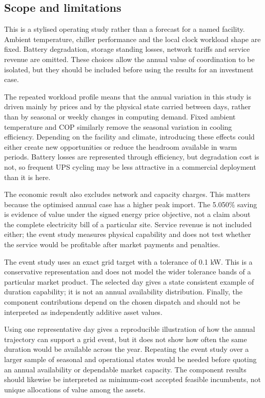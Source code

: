\subsection{Scope and limitations}

This is a stylised operating study rather than a forecast for a named facility.
Ambient temperature, chiller performance and the local clock workload shape are
fixed. Battery degradation, storage standing losses, network tariffs and service
revenue are omitted. These choices allow the annual value of coordination to be
isolated, but they should be included before using the results for an investment
case.

The repeated workload profile means that the annual variation in this study is
driven mainly by prices and by the physical state carried between days, rather
than by seasonal or weekly changes in computing demand. Fixed ambient temperature
and COP similarly remove the seasonal variation in cooling efficiency. Depending
on the facility and climate, introducing these effects could either create new
opportunities or reduce the headroom available in warm periods. Battery losses
are represented through efficiency, but degradation cost is not, so frequent UPS
cycling may be less attractive in a commercial deployment than it is here.

The economic result also excludes network and capacity charges. This matters
because the optimised annual case has a higher peak import. The 5.050\% saving is
evidence of value under the signed energy price objective, not a claim
about the complete electricity bill of a particular site. Service revenue is not
included either; the event study measures physical capability and does not test
whether the service would be profitable after market payments and penalties.

The event study uses an exact grid target with a tolerance of 0.1 kW. This is a
conservative representation and does not model the wider tolerance bands of a
particular market product. The selected day gives a state consistent example of
duration capability; it is not an annual availability distribution. Finally,
the component contributions depend on the chosen dispatch and should not be
interpreted as independently additive asset values.

Using one representative day gives a reproducible illustration of how the annual
trajectory can support a grid event, but it does not show how often the same
duration would be available across the year. Repeating the event study over a
larger sample of seasonal and operational states would be needed before quoting
an annual availability or dependable market capacity. The component results
should likewise be interpreted as minimum-cost accepted feasible incumbents,
not unique allocations of value among the assets.

